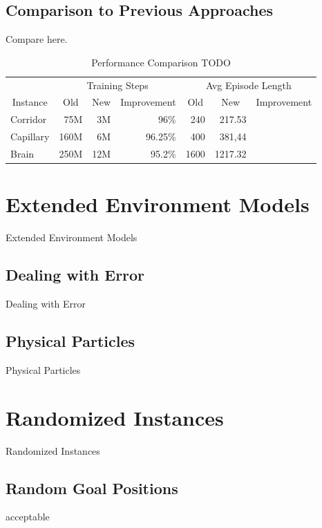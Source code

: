 \subsection{Comparison to Previous Approaches} \label{sec:EvalRLComparison}
Compare here.

\begin{table}
    \begin{center}
        \begin{tabular}{lrrrrrr}
            \toprule
            & \multicolumn{3}{c}{Training Steps} & \multicolumn{3}{c}{Avg Episode Length} \\
            \cmidrule(lr){2-4} \cmidrule(lr){5-7}
            \multicolumn{1}{c}{Instance} & \multicolumn{1}{c}{Old} & \multicolumn{1}{c}{New} & \multicolumn{1}{c}{Improvement} & \multicolumn{1}{c}{Old} & \multicolumn{1}{c}{New} & \multicolumn{1}{c}{Improvement} \\
            \midrule
            Corridor & 75M & 3M & 96\% & 240 & 217.53 & \\
            Capillary & 160M & 6M & 96.25\% & 400 & 381,44 & \\
            Brain & 250M & 12M & 95.2\% & 1600 & 1217.32 & \\
            \bottomrule
        \end{tabular}

    \end{center}
    \caption{Performance Comparison TODO} \label{tab:Eval/PreviousApproach}
\end{table}

\section{Extended Environment Models} \label{sec:EvalExtendedModels}
Extended Environment Models
\subsection{Dealing with Error} \label{sec:EvalError}
Dealing with Error
\subsection{Physical Particles} \label{sec:EvalPhysical}
Physical Particles
\section{Randomized Instances} \label{sec:EvalRandomness}
Randomized Instances
\subsection{Random Goal Positions} \label{sec:EvalRandomGoals}
acceptable


